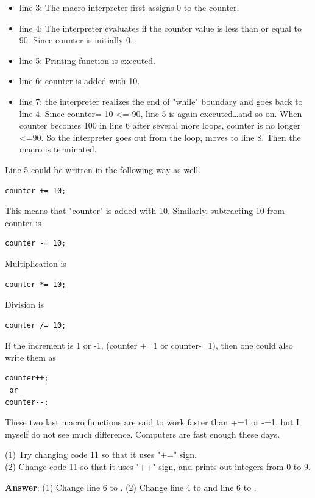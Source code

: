 \begin{itemize}
\item line 3: The macro interpreter first assigns 0 to the counter.
\item line 4: The interpreter evaluates if the counter value is less than or equal to 90. Since counter is initially 0\ldots 
\item line 5: Printing function is executed. 
\item line 6: counter is added with 10. 
\item line 7: the interpreter realizes the end of "while" boundary and goes back to line 4. Since counter= 10 <= 90, line 5 is again executed\ldots and so on. When counter becomes 100 in line 6 after several more loops, counter is no longer <=90. So the interpreter goes out from the loop, moves to line 8. Then the macro is terminated.
\end{itemize}

Line 5 could be written in the following way as well.
\begin{lstlisting}[numbers=none]
counter += 10;
\end{lstlisting}
This means that "counter" is added with 10. Similarly, subtracting 10 from counter is 
\begin{lstlisting}[numbers=none]
counter -= 10;
\end{lstlisting}
Multiplication is 
\begin{lstlisting}[numbers=none]
counter *= 10;
\end{lstlisting}
Division is
\begin{lstlisting}[numbers=none]
counter /= 10;
\end{lstlisting}
If the increment is 1 or -1, (counter +=1 or counter-=1), then one could also write them  as 
\begin{lstlisting}[numbers=none]
counter++;
 or 
counter--;
\end{lstlisting}
These two last macro functions are said to work faster than +=1 or -=1, but I myself do not see much difference. Computers are fast enough these days. 

\begin{indentexercise}{1}
(1) Try changing code 11 so that it uses "+=" sign.\\
(2) Change code 11 so that it uses "++" sign, and prints out integers from 0 to 9.\\

\item \textbf{Answer}: (1) Change line 6 to . (2) Change line 4 to  and line 6 to .
\end{indentexercise}

